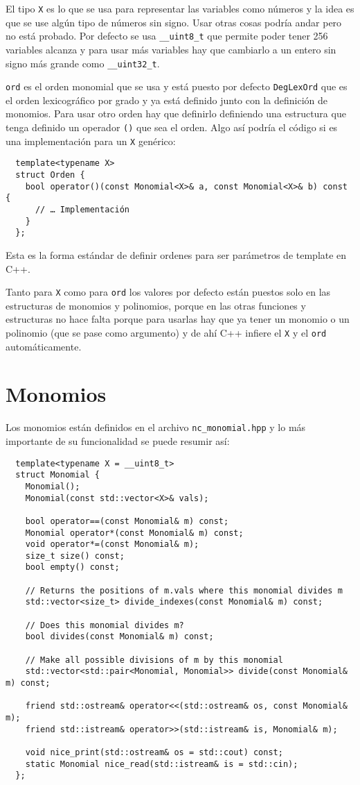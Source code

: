 \documentclass[12pt]{report}
\theoremstyle{customstyle}
\theoremstyle{factstyle}
\begin{document}
El tipo \texttt{X} es lo que se usa para representar las variables como números y la idea es que se use algún tipo de números sin signo. Usar otras cosas podría andar pero no está probado. Por defecto se usa \texttt{\_\_uint8\_t} que permite poder tener 256 variables alcanza y para usar más variables hay que cambiarlo a un entero sin signo más grande como \texttt{\_\_uint32\_t}.

\texttt{ord} es el orden monomial que se usa y está puesto por defecto \texttt{DegLexOrd} que es el orden lexicográfico por grado y ya está definido junto con la definición de monomios. Para usar otro orden hay que definirlo definiendo una estructura que tenga definido un operador \texttt{()} que sea el orden. Algo así podría el código si es una implementación para un \texttt{X} genérico:

\begin{verbatim}
  template<typename X>
  struct Orden {
    bool operator()(const Monomial<X>& a, const Monomial<X>& b) const {
      // … Implementación
    }
  };
\end{verbatim}

Esta es la forma estándar de definir ordenes para ser parámetros de template en C++.

Tanto para \texttt{X} como para \texttt{ord} los valores por defecto están puestos solo en las estructuras de monomios y polinomios, porque en las otras funciones y estructuras no hace falta porque para usarlas hay que ya tener un monomio o un polinomio (que se pase como argumento) y de ahí C++ infiere el \texttt{X} y el \texttt{ord} automáticamente.

\section{Monomios}

Los monomios están definidos en el archivo \texttt{nc\_monomial.hpp} y lo más importante de su funcionalidad se puede resumir así:

\begin{verbatim}
  template<typename X = __uint8_t>
  struct Monomial {
    Monomial();
    Monomial(const std::vector<X>& vals);

    bool operator==(const Monomial& m) const;
    Monomial operator*(const Monomial& m) const;
    void operator*=(const Monomial& m);
    size_t size() const;
    bool empty() const;

    // Returns the positions of m.vals where this monomial divides m
    std::vector<size_t> divide_indexes(const Monomial& m) const;

    // Does this monomial divides m?
    bool divides(const Monomial& m) const;

    // Make all possible divisions of m by this monomial
    std::vector<std::pair<Monomial, Monomial>> divide(const Monomial& m) const;

    friend std::ostream& operator<<(std::ostream& os, const Monomial& m);
    friend std::istream& operator>>(std::istream& is, Monomial& m);

    void nice_print(std::ostream& os = std::cout) const;
    static Monomial nice_read(std::istream& is = std::cin);
  };
\end{verbatim}
\end{document}
